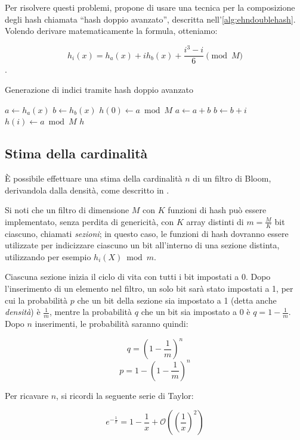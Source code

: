 Per risolvere questi problemi, \cite{bloom-doublehash} propone di usare una tecnica per la
composizione degli hash chiamata ``hash doppio avanzato'', descritta
nell'\autoref{alg:ehndoublehash}. Volendo derivare matematicamente la formula, otteniamo:

$$ h_i(x) = h_a(x) + ih_b(x) + \frac{i^3-i}{6} \pmod M $$.

\begin{algorithm}
\caption{Generazione di indici tramite hash doppio avanzato}
\label{alg:ehndoublehash}
\begin{algorithmic}[1]
	\State $a \gets h_a(x)$
	\State $b \gets h_b(x)$
	\State $h(0) \gets a \bmod M$
		\State $a \gets a+b$
		\State $b \gets b+i$
		\State $h(i) \gets a \bmod M$
	\EndFor
	\State \Return $h$
\EndProcedure
\end{algorithmic}
\end{algorithm}

\subsection{Stima della cardinalità}
\label{sec:bloomcard}

È possibile effettuare una stima della cardinalità $n$ di un filtro di Bloom, derivandola
dalla densità, come descritto in \cite{bloom-scalable}.

Si noti che un filtro di dimensione $M$ con $K$ funzioni di hash può essere implementato, senza
perdita di genericità, con $K$ array distinti di $m=\frac{M}{K}$ bit ciascuno, chiamati
\emph{sezioni}; in questo caso, le funzioni di hash dovranno essere utilizzate per indicizzare
ciascuno un bit all'interno di una sezione distinta, utilizzando per esempio $h_i(X) \bmod m$.

Ciascuna sezione inizia il ciclo di vita con tutti i bit impostati a 0. Dopo l'inserimento di un
elemento nel filtro, un solo bit sarà stato impostati a 1, per cui la probabilità $p$ che un bit
della sezione sia impostato a 1 (detta anche \emph{densità}) è $\frac{1}{m}$, mentre la probabilità
$q$ che un bit sia impostato a 0 è $ q=1-\frac{1}{m}$. Dopo $n$ inserimenti, le probabilità saranno
quindi: 

$$ q = (1-\frac{1}{m})^n $$
$$ p = 1-(1-\frac{1}{m})^n $$

Per ricavare $n$, si ricordi la seguente serie di Taylor:

$$ e^{-\frac{1}{x}} = 1 - \frac{1}{x} + \mathcal{O}((\frac{1}{x})^2) $$

